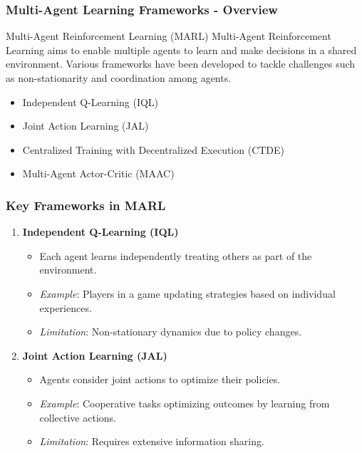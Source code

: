 \documentclass[aspectratio=169]{beamer}
\begin{document}
\begin{frame}[fragile]
    \frametitle{Multi-Agent Learning Frameworks - Overview}
    \begin{block}{Multi-Agent Reinforcement Learning (MARL)}
        Multi-Agent Reinforcement Learning aims to enable multiple agents to learn and make decisions in a shared environment. 
        Various frameworks have been developed to tackle challenges such as non-stationarity and coordination among agents.
    \end{block}
    \begin{itemize}
        \item Independent Q-Learning (IQL)
        \item Joint Action Learning (JAL)
        \item Centralized Training with Decentralized Execution (CTDE)
        \item Multi-Agent Actor-Critic (MAAC)
    \end{itemize}
\end{frame}

\begin{frame}[fragile]
    \frametitle{Key Frameworks in MARL}
    \begin{enumerate}
        \item \textbf{Independent Q-Learning (IQL)}
        \begin{itemize}
            \item Each agent learns independently treating others as part of the environment.
            \item \textit{Example}: Players in a game updating strategies based on individual experiences.
            \item \textit{Limitation}: Non-stationary dynamics due to policy changes.
        \end{itemize}

        \item \textbf{Joint Action Learning (JAL)}
        \begin{itemize}
            \item Agents consider joint actions to optimize their policies.
            \item \textit{Example}: Cooperative tasks optimizing outcomes by learning from collective actions.
            \item \textit{Limitation}: Requires extensive information sharing.
        \end{itemize}
    \end{enumerate}
\end{frame}
\end{document}
